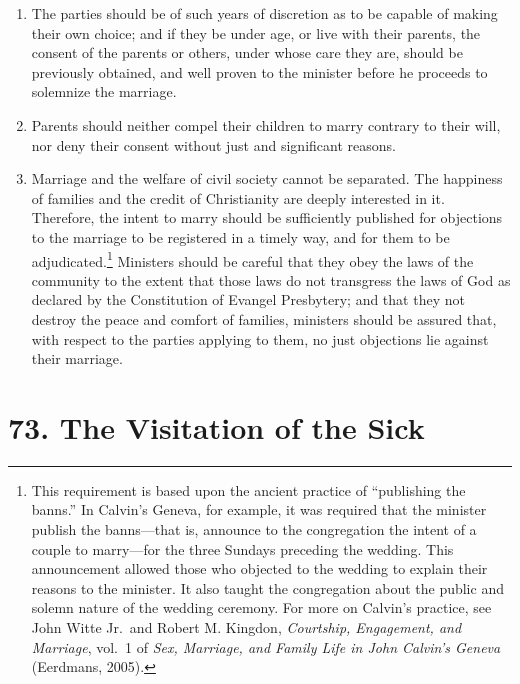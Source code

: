 \documentclass[
]{book}
\providecommand{\tightlist}{%
  \setlength{\itemsep}{0pt}\setlength{\parskip}{0pt}}
\begin{document}
\begin{enumerate}
\def\labelenumi{\arabic{enumi}.}
\setcounter{enumi}{4}
\tightlist
\item
  The parties should be of such years of discretion as to be capable of making their own choice; and if they be under age, or live with their parents, the consent of the parents or others, under whose care they are, should be previously obtained, and well proven to the minister before he proceeds to solemnize the marriage.
\item
  Parents should neither compel their children to marry contrary to their will, nor deny their consent without just and significant reasons.
\item
  Marriage and the welfare of civil society cannot be separated. The happiness of families and the credit of Christianity are deeply interested in it. Therefore, the intent to marry should be sufficiently published for objections to the marriage to be registered in a timely way, and for them to be adjudicated.\footnote{This requirement is based upon the ancient practice of ``publishing the banns.'' In Calvin's Geneva, for example, it was required that the minister publish the banns---that is, announce to the congregation the intent of a couple to marry---for the three Sundays preceding the wedding. This announcement allowed those who objected to the wedding to explain their reasons to the minister. It also taught the congregation about the public and solemn nature of the wedding ceremony. For more on Calvin's practice, see John Witte Jr.~and Robert M. Kingdon, \emph{Courtship, Engagement, and Marriage}, vol.~1 of \emph{Sex, Marriage, and Family Life in John Calvin's Geneva} (Eerdmans, 2005).} Ministers should be careful that they obey the laws of the community to the extent that those laws do not transgress the laws of God as declared by the Constitution of Evangel Presbytery; and that they not destroy the peace and comfort of families, ministers should be assured that, with respect to the parties applying to them, no just objections lie against their marriage.
\end{enumerate}

\hypertarget{the-visitation-of-the-sick}{%
\section*{73. The Visitation of the Sick}\label{the-visitation-of-the-sick}}

\protect\hypertarget{chapter-slug-73-the-visitation-of-the-sick}{\href{}{}}
\end{document}
